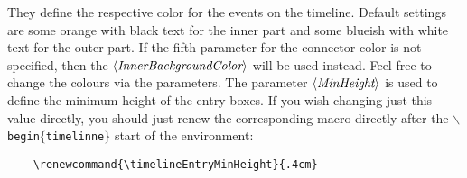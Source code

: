 \documentclass{article}
\newcommand{\parameter}[1]{\langle\normalfont\textit{#1}\rangle}
\begin{document}
They define the respective color for the events on the timeline.
Default settings are some orange  with black text for the inner part and some blueish  with white text for the outer part. 
If the fifth parameter for the connector color is not specified, then the $\parameter{InnerBackgroundColor}$ will be used instead.
Feel free to change the colours via the parameters.
The parameter $\parameter{MinHeight}$ is used to define the minimum height of the entry boxes.
If you wish changing just this value directly, you should just renew the corresponding macro directly after the \texttt{$\backslash$begin$\{$timelinne$\}$} start of the environment:
\begin{lstlisting}
	\renewcommand{\timelineEntryMinHeight}{.4cm}
\end{lstlisting}
\end{document}
